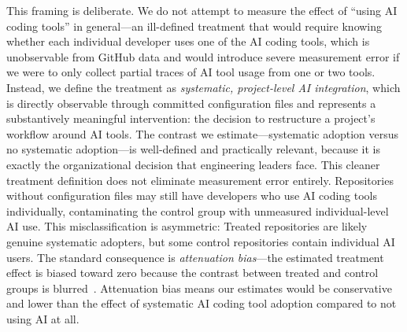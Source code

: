 This framing is deliberate.
We do not attempt to measure the effect of ``using AI coding tools'' in general---an ill-defined treatment that would require knowing whether each individual developer uses one of the AI coding tools, which is unobservable from GitHub data and would introduce severe measurement error if we were to only collect partial traces of AI tool usage from one or two tools.
Instead, we define the treatment as \emph{systematic, project-level AI integration}, which is directly observable through committed configuration files and represents a substantively meaningful intervention: the decision to restructure a project's workflow around AI tools.
The contrast we estimate---systematic adoption versus no systematic adoption---is well-defined and practically relevant, because it is exactly the organizational decision that engineering leaders face.
This cleaner treatment definition does not eliminate measurement error entirely.
Repositories without configuration files may still have developers who use AI coding tools individually, contaminating the control group with unmeasured individual-level AI use.
This misclassification is asymmetric: Treated repositories are likely genuine systematic adopters, but some control repositories contain individual AI users.
The standard consequence is \emph{attenuation bias}---the estimated treatment effect is biased toward zero because the contrast between treated and control groups is blurred~\cite{hausman2001mismeasured}.
Attenuation bias means our estimates would be conservative and lower than the effect of systematic AI coding tool adoption compared to not using AI at all.

